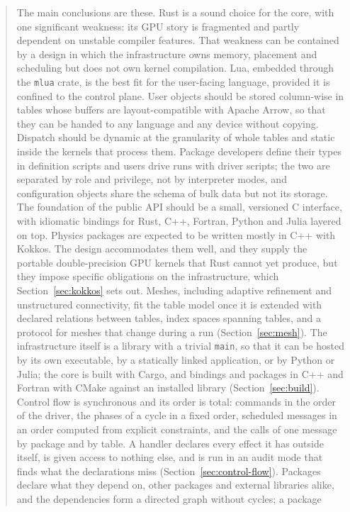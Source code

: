 \documentclass[11pt,a4paper]{article}
\newcommand{\code}[1]{\texttt{#1}}
\begin{document}
\begin{abstract}
The main conclusions are these.  Rust is a sound choice for the core, with one
significant weakness: its GPU story is fragmented and partly dependent on
unstable compiler features.  That weakness can be contained by a design in
which the infrastructure owns memory, placement and scheduling but does not
own kernel compilation.  Lua, embedded through the \code{mlua} crate, is the
best fit for the user-facing language, provided it is confined to the control
plane.  User objects should be stored column-wise in tables whose buffers are
layout-compatible with Apache Arrow, so that they can be handed to any
language and any device without copying.  Dispatch should be dynamic at the
granularity of whole tables and static inside the kernels that process them.
Package developers define their types in definition scripts and users drive
runs with driver scripts; the two are separated by role and privilege, not by
interpreter modes, and configuration objects share the schema of bulk data
but not its storage.
The foundation of the public API should be a small, versioned C interface,
with idiomatic bindings for Rust, C++, Fortran, Python and Julia layered on
top.  Physics packages are expected to be written mostly in C++ with Kokkos.
The design accommodates them well, and they supply the portable
double-precision GPU kernels that Rust cannot yet produce, but they impose
specific obligations on the infrastructure, which Section~\ref{sec:kokkos}
sets out.  Meshes, including adaptive refinement and unstructured
connectivity, fit the table model once it is extended with declared relations
between tables, index spaces spanning tables, and a protocol for meshes that
change during a run (Section~\ref{sec:mesh}).  The infrastructure itself is
a library with a trivial \code{main}, so that it can be hosted by its own
executable, by a statically linked application, or by Python or Julia; the
core is built with Cargo, and bindings and packages in C++ and Fortran with
CMake against an installed library (Section~\ref{sec:build}).
Control flow is synchronous and its order is total: commands in the order of
the driver, the phases of a cycle in a fixed order, scheduled messages in an
order computed from explicit constraints, and the calls of one message by
package and by table.  A handler declares every effect it has outside
itself, is given access to nothing else, and is run in an audit mode that
finds what the declarations miss (Section~\ref{sec:control-flow}).
Packages declare what they depend on, other packages and external libraries
alike, and the dependencies form a directed graph without cycles; a package

\end{abstract}
\end{document}

